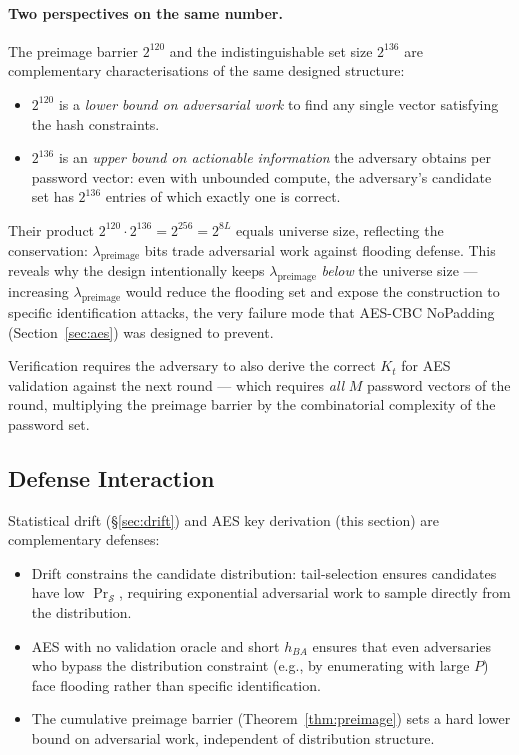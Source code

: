 \documentclass[11pt,a4paper]{article}
\begin{document}
\paragraph{Two perspectives on the same number.} The preimage barrier $2^{120}$ and the indistinguishable set size $2^{136}$ are complementary characterisations of the same designed structure:
\begin{itemize}[leftmargin=*]
\item $2^{120}$ is a \emph{lower bound on adversarial work} to find any single vector satisfying the hash constraints.
\item $2^{136}$ is an \emph{upper bound on actionable information} the adversary obtains per password vector: even with unbounded compute, the adversary's candidate set has $2^{136}$ entries of which exactly one is correct.
\end{itemize}
Their product $2^{120} \cdot 2^{136} = 2^{256} = 2^{8L}$ equals universe size, reflecting the conservation: $\lambda_{\text{preimage}}$ bits trade adversarial work against flooding defense. This reveals why the design intentionally keeps $\lambda_{\text{preimage}}$ \emph{below} the universe size --- increasing $\lambda_{\text{preimage}}$ would reduce the flooding set and expose the construction to specific identification attacks, the very failure mode that AES-CBC NoPadding (Section~\ref{sec:aes}) was designed to prevent.

Verification requires the adversary to also derive the correct $K_t$ for AES validation against the next round --- which requires \emph{all} $M$ password vectors of the round, multiplying the preimage barrier by the combinatorial complexity of the password set.

\subsection{Defense Interaction}

Statistical drift (§\ref{sec:drift}) and AES key derivation (this section) are complementary defenses:

\begin{itemize}[leftmargin=*]
\item Drift constrains the candidate distribution: tail-selection ensures candidates have low $\Pr_\mathcal{S}$, requiring exponential adversarial work to sample directly from the distribution.
\item AES with no validation oracle and short $h_{BA}$ ensures that even adversaries who bypass the distribution constraint (e.g., by enumerating with large $P$) face flooding rather than specific identification.
\item The cumulative preimage barrier (Theorem~\ref{thm:preimage}) sets a hard lower bound on adversarial work, independent of distribution structure.
\end{itemize}
\end{document}
